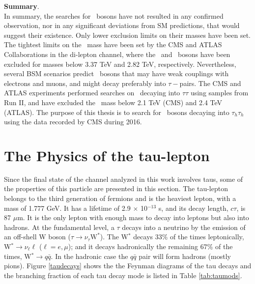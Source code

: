 \textbf{Summary}. \\

In summary, the searches for \Zprime~bosons have not resulted in any confirmed observation,
nor in any significant deviations from SM predictions, that would suggest their existence. Only
lower exclusion limits on their masses have been set. The tightest limits on the \Zprime~mass
have been set by the CMS and ATLAS Collaborations in the di-lepton channel, where the 
\ZprimeSSM~and \Zprimepsi~bosons have been excluded for masses below 3.37 TeV and 2.82 TeV, respectively.
Nevertheless, several BSM scenarios predict \Zprime~bosons that may have weak couplings with
electrons and muons, and might decay preferably into $\tau-$pairs. The CMS and ATLAS experiments
performed searches on \Zprime~decaying into $\tau\tau$ using samples from Run II, and 
have excluded the \ZprimeSSM~mass below 2.1 TeV (CMS) and 2.4 TeV (ATLAS). The purpose of this thesis
is to search for \Zprime~bosons decaying into $\tau_{h}\tau_{h}$ using the data recorded by CMS during 2016.

\section{The Physics of the tau-lepton}
\label{sec:Taus}

Since the final state of the channel analyzed in this work involves 
taus, some of the properties of this particle are presented 
in this section. The tau-lepton belongs to the third generation of fermions and is the 
heaviest lepton, with a mass of 1.777 GeV. It has a lifetime of 2.9 $\times$ 10$^{-13}$ s, and its 
decay length, $c\tau$, is 87 $\mu$m. It is the only lepton with enough mass 
to decay into leptons but also into hadrons. At the fundamental 
level, a $\tau$ decays into a neutrino by the emission of an off-shell 
W boson ($\tau \rightarrow \nu_{\tau} \text{W}^*$). The W$^*$ decays $33\%$ of the times
leptonically, W$^* \rightarrow \nu_{\ell} \ell$ ($\ell = e,\mu$); and it decays 
hadronically the remaining $67\%$ of the times, W$^* \rightarrow q \bar{q}$. 
In the hadronic case the $q\bar{q}$ pair will form hadrons (mostly pions). Figure \ref{taudecays} shows the 
the Feynman diagrams of the tau decays and the branching fraction of each tau decay mode is 
listed in Table \ref{tab:taumods}. \\






